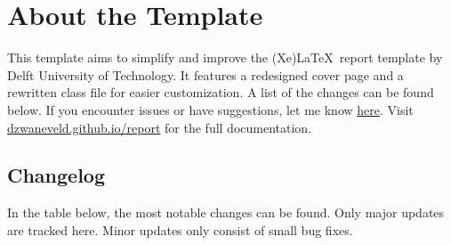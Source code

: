 \chapter{About the Template}
\label{chapter:title}

This template aims to simplify and improve the (Xe)\LaTeX~report template by Delft University of Technology. It features a redesigned cover page and a rewritten class file for easier customization. A list of the changes can be found below. If you encounter issues or have suggestions, let me know \underline{\href{https://github.com/dzwaneveld/TU-Delft-Unofficial-Report-Template/issues}{here}}. Visit \url{dzwaneveld.github.io/report} for the full documentation.

\section{Changelog}

In the table below, the most notable changes can be found. Only major updates are tracked here. Minor updates only consist of small bug fixes.

